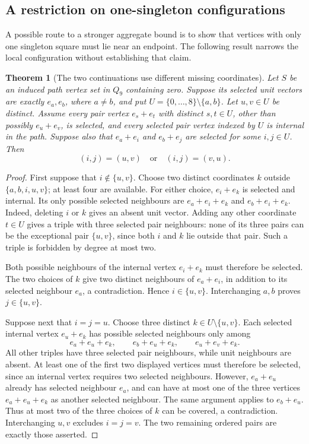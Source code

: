 \documentclass[11pt,a4paper]{article}
\newtheorem{theorem}{Theorem}[section]
\theoremstyle{definition}
\theoremstyle{remark}
\newcommand{\Q}{Q}
\begin{document}
\subsection{A restriction on one-singleton configurations}
A possible route to a stronger aggregate bound is to show that vertices with only one singleton square must lie near an endpoint. The following result narrows the local configuration without establishing that claim.

\begin{theorem}[The two continuations use different missing coordinates]\label{thm:split-arms}
Let $S$ be an induced path vertex set in $\Q_9$ containing zero. Suppose its selected unit vectors are exactly $e_a,e_b$, where $a\ne b$, and put $U=\{0,\ldots,8\}\setminus\{a,b\}$. Let $u,v\in U$ be distinct. Assume every pair vertex $e_s+e_t$ with distinct $s,t\in U$, other than possibly $e_u+e_v$, is selected, and every selected pair vertex indexed by $U$ is internal in the path. Suppose also that $e_a+e_i$ and $e_b+e_j$ are selected for some $i,j\in U$. Then
\[
(i,j)=(u,v)\quad\text{or}\quad(i,j)=(v,u).
\]
\end{theorem}
\begin{proof}
First suppose that $i\notin\{u,v\}$. Choose two distinct coordinates $k$ outside $\{a,b,i,u,v\}$; at least four are available. For either choice, $e_i+e_k$ is selected and internal. Its only possible selected neighbours are $e_a+e_i+e_k$ and $e_b+e_i+e_k$. Indeed, deleting $i$ or $k$ gives an absent unit vector. Adding any other coordinate $t\in U$ gives a triple with three selected pair neighbours: none of its three pairs can be the exceptional pair $\{u,v\}$, since both $i$ and $k$ lie outside that pair. Such a triple is forbidden by degree at most two.

Both possible neighbours of the internal vertex $e_i+e_k$ must therefore be selected. The two choices of $k$ give two distinct neighbours of $e_a+e_i$, in addition to its selected neighbour $e_a$, a contradiction. Hence $i\in\{u,v\}$. Interchanging $a,b$ proves $j\in\{u,v\}$.

Suppose next that $i=j=u$. Choose three distinct $k\in U\setminus\{u,v\}$. Each selected internal vertex $e_u+e_k$ has possible selected neighbours only among
\[
e_a+e_u+e_k,\qquad e_b+e_u+e_k,\qquad e_u+e_v+e_k.
\]
All other triples have three selected pair neighbours, while unit neighbours are absent. At least one of the first two displayed vertices must therefore be selected, since an internal vertex requires two selected neighbours. However, $e_a+e_u$ already has selected neighbour $e_a$, and can have at most one of the three vertices $e_a+e_u+e_k$ as another selected neighbour. The same argument applies to $e_b+e_u$. Thus at most two of the three choices of $k$ can be covered, a contradiction. Interchanging $u,v$ excludes $i=j=v$. The two remaining ordered pairs are exactly those asserted.
\end{proof}
\end{document}
